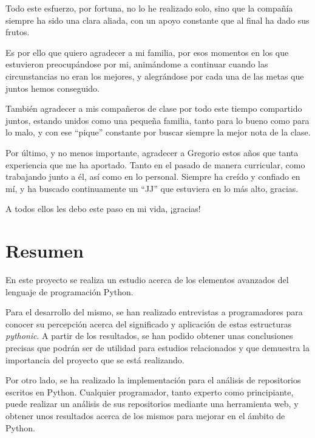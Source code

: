 \documentclass[a4paper, 12pt]{book}
\begin{document}
Todo este esfuerzo, por fortuna, no lo he realizado solo, sino que la compañía siempre ha sido una clara aliada, con un apoyo constante que al final ha dado sus frutos.

Es por ello que quiero agradecer a mi familia, por esos momentos en los que estuvieron preocupándose por mi, animándome a continuar cuando las circunstancias no eran los mejores, y alegrándose por cada una de las metas que juntos hemos conseguido.

También agradecer a mis compañeros de clase por todo este tiempo compartido juntos, estando unidos como una pequeña familia, tanto para lo bueno como para lo malo, y con ese ``pique'' constante por buscar siempre la mejor nota de la clase.

Por último, y no menos importante, agradecer a Gregorio estos años que tanta experiencia que me ha aportado. Tanto en el pasado de manera curricular, como trabajando junto a él, así como en lo personal. Siempre ha creído y confiado en mí, y ha buscado continuamente un ``JJ'' que estuviera en lo más alto, gracias.

A todos ellos les debo este paso en mi vida, ¡gracias!


\chapter*{Resumen}

En este proyecto se realiza un estudio acerca de los elementos avanzados del lenguaje de programación Python.

Para el desarrollo del mismo, se han realizado entrevistas a programadores para conocer su percepción acerca del significado y aplicación de estas estructuras \textit{pythonic}. A partir de los resultados, se han podido obtener unas conclusiones precisas que podrán ser de utilidad para estudios relacionados y que demuestra la importancia del proyecto que se está realizando.

Por otro lado, se ha realizado la implementación para el análisis de repositorios escritos en Python. Cualquier programador, tanto experto como principiante, puede realizar un análisis de sus repositorios mediante una herramienta web, y obtener unos resultados acerca de los mismos para mejorar en el ámbito de Python.
\end{document}
